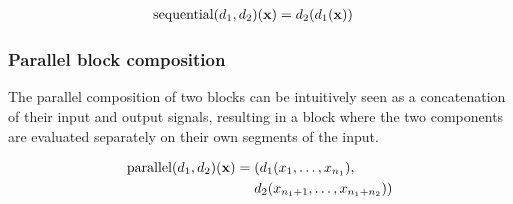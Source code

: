 \begin{minipage}{0.5\linewidth}
  \begin{prooftree}
  \end{prooftree}
  \begin{align*}
    \Sequential(d_1, d_2)(\mathbf{x})    ={} & d_2(d_1(\mathbf{x}))
  \end{align*}
\end{minipage}
\begin{minipage}{0.5\linewidth}
  \begin{figure}[H]
    \centering
    \label{fig:block_seq}
    
  \end{figure}
\end{minipage}

\subsubsection{Parallel block composition}
The parallel composition of two blocks can be intuitively seen as a concatenation of their input and output
signals, resulting in a block where the two components are evaluated separately on their own segments of the
input.

\begin{minipage}{0.5\linewidth}
  \begin{prooftree}
  \end{prooftree}
  \begin{align*}
    \Parallel(d_1, d_2)(\mathbf{x})            ={} & (d_1(x_1, \dots, x_{n_1}),              \\
                                                   & d_2(x_{n_1 + 1}, \dots, x_{n_1 + n_2})) \\
  \end{align*}
\end{minipage}
\begin{minipage}{0.5\linewidth}
  \begin{figure}[H]
    \centering
    \label{fig:block_par}
    
  \end{figure}
\end{minipage}

